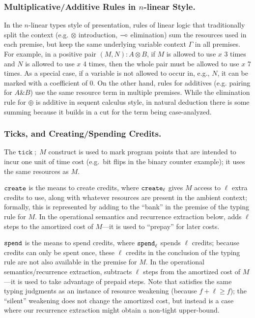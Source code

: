 \subsubsection{Multiplicative/Additive Rules in $n$-linear Style.}
In the $n$-linear types style of presentation, rules of linear logic
that traditionally split the context (e.g. $\otimes$ introduction,
$\multimap$ elimination) sum the resources used in each premise, but keep
the same underlying variable context $\Gamma$ in all premises.  For
example, in a positive pair $(M,N) : A \otimes B$, if $M$ is allowed to
use $x$ 3 times and $N$ is allowed to use $x$ 4 times, then the whole
pair must be allowed to use $x$ 7 times.  As a special case, if a
variable is not allowed to occur in, e.g., $N$, it can be marked with a
coefficient of 0.  On the other hand, rules for additives (e.g. pairing
for $A \& B$) use the same resource term in multiple premises.  While
the elimination rule for $\oplus$ is additive in sequent calculus style,
in natural deduction there is some summing because it builds in a cut
for the term being case-analyzed.

\subsubsection{Ticks, and Creating/Spending Credits.}\label{ssec:wdt}

The $\texttt{tick} \; ; \; M$ construct is used to mark program points that
are intended to incur one unit of time cost (e.g.\ bit flips in the binary
counter example); it uses the same resources as $M$.  

$\texttt{create}$ is the means to create credits, where $\texttt{create}_\ell$
gives $M$ access to $\ell$ extra credits to use, along with whatever
resources are present in the ambient context; formally, this is
represented by adding to the ``bank'' in the premise of the typing rule
for $M$.  In the operational semantics and recurrence extraction below,
\waitname\/ adds $\ell$ steps to the amortized cost of $M$---it is used to
``prepay'' for later costs.  

$\texttt{spend}$ is the means to spend credits, where $\texttt{spend}_\ell$ spends
$\ell$ credits; because credits can only be spent once, these $\ell$
credits in the conclusion of the typing rule are not also available in
the premise for $M$.  In the operational semantics/recurrence
extraction, \discname\/ subtracts $\ell$ steps from the amortized cost of
$M$---it is used to take advantage of prepaid steps.  Note that
\discname\/ satisfies the same typing judgments as an instance of
resource weakening (because $f + \ell \ge f$); the ``silent'' weakening
does not change the amortized cost, but instead is a case where our recurrence extraction might
obtain a non-tight upper-bound.


